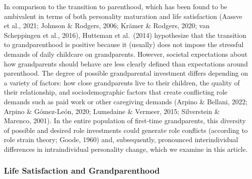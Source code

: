\documentclass[
  english,
  man,floatsintext]{apa7}
\begin{document}
In comparison to the transition to parenthood, which has been found to be ambivalent in terms of both personality maturation and life satisfaction (Aassve et al., 2021; Johnson \& Rodgers, 2006; Krämer \& Rodgers, 2020; van Scheppingen et al., 2016), Hutteman et al.~(2014) hypothesize that the transition to grandparenthood is positive because it (usually) does not impose the stressful demands of daily childcare on grandparents. However, societal expectations about how grandparents should behave are less clearly defined than expectations around parenthood. The degree of possible grandparental investment differs depending on a variety of factors: how close grandparents live to their children, the quality of their relationship, and sociodemographic factors that create conflicting role demands such as paid work or other caregiving demands (Arpino \& Bellani, 2022; Arpino \& Gómez-León, 2020; Lumsdaine \& Vermeer, 2015; Silverstein \& Marenco, 2001). In the entire population of first-time grandparents, this diversity of possible and desired role investments could generate role conflicts (according to role strain theory; Goode, 1960) and, subsequently, pronounced interindividual differences in intraindividual personality change, which we examine in this article.

\hypertarget{life-satisfaction-and-grandparenthood}{%
\subsubsection{Life Satisfaction and Grandparenthood}\label{life-satisfaction-and-grandparenthood}}
\end{document}
